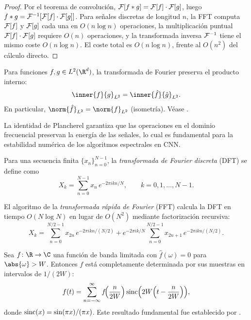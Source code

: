 \begin{proof}
Por el teorema de convoluci\'on, $\mathcal{F}[f * g] = \mathcal{F}[f] \cdot \mathcal{F}[g]$, luego
$f * g = \mathcal{F}^{-1}[\mathcal{F}[f] \cdot \mathcal{F}[g]]$. Para se\~nales discretas de
longitud $n$, la FFT computa $\mathcal{F}[f]$ y $\mathcal{F}[g]$ cada una en $O(n \log n)$
operaciones, la multiplicaci\'on puntual $\mathcal{F}[f] \cdot \mathcal{F}[g]$ requiere $O(n)$
operaciones, y la transformada inversa $\mathcal{F}^{-1}$ tiene el mismo coste
$O(n \log n)$. El coste total es $O(n \log n)$, frente al $O(n^2)$ del c\'alculo
directo.
\end{proof}

\begin{theorem}
\label{thm:grids:plancherel}
Para funciones $f, g \in L^2(\R^d)$, la transformada de Fourier preserva el
producto interno:
\[
  \inner{f}{g}_{L^2} = \inner{\hat{f}}{\hat{g}}_{L^2}.
\]
En particular, $\norm{\hat{f}}_{L^2} = \norm{f}_{L^2}$ (isometr\'ia). V\'ease
\citep[Theorem~8.29]{Folland1999}.
\end{theorem}

La identidad de Plancherel garantiza que las operaciones en el dominio
frecuencial preservan la energ\'ia de las se\~nales, lo cual es fundamental para
la estabilidad num\'erica de los algoritmos espectrales en CNN.

\begin{definition}
\label{def:grids:dft}
Para una secuencia finita $\{x_n\}_{n=0}^{N-1}$, la \emph{transformada de
Fourier discreta} (DFT) se define como
\[
  X_k = \sum_{n=0}^{N-1} x_n\, e^{-2\pi i kn/N}, \qquad k = 0, 1, \ldots, N-1.
\]
\end{definition}

\begin{definition}
\label{def:grids:fft}
El algoritmo de la \emph{transformada r\'apida de Fourier} (FFT) calcula la DFT
en tiempo $O(N \log N)$ en lugar de $O(N^2)$ mediante factorizaci\'on
recursiva:
\[
  X_k = \sum_{n=0}^{N/2-1} x_{2n}\, e^{-2\pi i kn/(N/2)}
   + e^{-2\pi i k/N} \sum_{n=0}^{N/2-1} x_{2n+1}\, e^{-2\pi i kn/(N/2)}.
\]
\end{definition}

\begin{theorem}
\label{thm:grids:nyquist}
Sea $f \colon \R \to \C$ una funci\'on de banda limitada con
$\hat{f}(\omega) = 0$ para $\abs{\omega} > W$. Entonces $f$ est\'a completamente
determinada por sus muestras en intervalos de $1/(2W)$:
\[
  f(t) = \sum_{n=-\infty}^{\infty} f\!\Big(\frac{n}{2W}\Big)
    \operatorname{sinc}\!\Big(2W\Big(t - \frac{n}{2W}\Big)\Big),
\]
donde $\operatorname{sinc}(x) = \sin(\pi x)/(\pi x)$. Este resultado fundamental fue
establecido por \citet{Shannon1948}.
\end{theorem}


